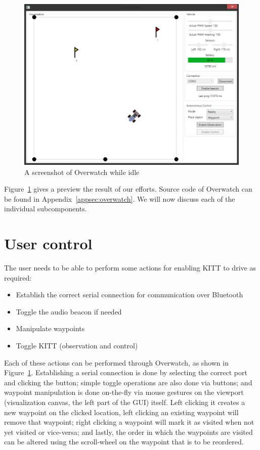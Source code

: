 \documentclass[11pt,titlepage]{report}
\begin{document}
\begin{figure}[H]
	\centering
	\includegraphics[width=\linewidth]{resource/overwatch-screenshot.png}
	\caption{A screenshot of Overwatch while idle}
	\label{fig:overwatch-screenshot}
\end{figure}

Figure~\ref{fig:overwatch-screenshot} gives a preview the result of our efforts. Source code of Overwatch can be found in Appendix~\ref{appsec:overwatch}. We will now discuss each of the individual subcomponents.

\section{User control}
The user needs to be able to perform some actions for enabling KITT to drive as required:

\begin{itemize}
	\item Establish the correct serial connection for communication over Bluetooth
	\item Toggle the audio beacon if needed
	\item Manipulate waypoints
	\item Toggle KITT (observation and control)
\end{itemize}

Each of these actions can be performed through Overwatch, as shown in Figure~\ref{fig:overwatch-screenshot}. Establishing a serial connection is done by selecting the correct port and clicking the button; simple toggle operations are also done via buttons; and waypoint manipulation is done on-the-fly via mouse gestures on the viewport (visualization canvas, the left part of the GUI) itself. Left clicking it creates a new waypoint on the clicked location, left clicking an existing waypoint will remove that waypoint; right clicking a waypoint will mark it as visited when not yet visited or vice-versa; and lastly, the order in which the waypoints are visited can be altered using the scroll-wheel on the waypoint that is to be reordered.
\end{document}
